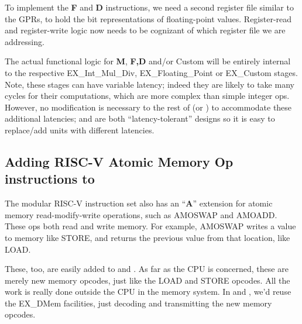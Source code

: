 To implement the {\bf F} and {\bf D} instructions, we need a second
register file similar to the GPRs, to hold the bit representations of
floating-point values.  Register-read and register-write logic now
needs to be cognizant of which register file we are addressing.


The actual functional logic for {\bf M}, {\bf F,D} and/or Custom will
be entirely internal to the respective EX\_Int\_Mul\_Div,
EX\_Floating\_Point or EX\_Custom stages.  Note, these stages can have
variable latency; indeed they are likely to take many cycles for their
computations, which are more complex than simple integer ops.
However, no modification is necessary to the rest of {\DRUM} (or
{\FIFE}) to accommodate these additional latencies; {\DRUM} and
{\FIFE} are both ``latency-tolerant'' designs so it is easy to
replace/add units with different latencies.


\subsection{Adding RISC-V Atomic Memory Op instructions to {\DRUM}}


The modular RISC-V instruction set also has an ``{\bf A}'' extension
for atomic memory read-modify-write operations, such as AMOSWAP and
AMOADD.  These ops both read and write memory.  For example, AMOSWAP
writes a value to memory like STORE, and returns the previous value
from that location, like LOAD.

These, too, are easily added to {\DRUM} and {\FIFE}.  As far as the CPU is
concerned, these are merely new memory opcodes, just like the LOAD and
STORE opcodes.  All the work is really done outside the CPU in the
memory system.  In {\DRUM} and {\FIFE}, we'd reuse the EX\_DMem facilities,
just decoding and transmitting the new memory opcodes.

